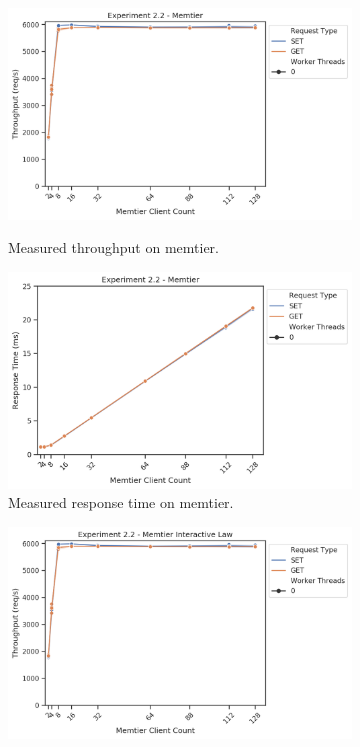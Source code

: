         \begin{figure}
            \vspace*{-.5\baselineskip}
                \centering
            \begin{subfigure}[t!]{0.45\textwidth}
                \centering
                \includegraphics[width=\textwidth]{../data_analysis/figures/2-2_mt_throughput.png}
                \caption{Measured throughput on memtier.\label{fig:22_mt_tp}}
                \includegraphics[width=\textwidth]{../data_analysis/figures/2-2_mt_response_time.png}
                \caption{Measured response time on memtier.\label{fig:22_mt_rt}}
            \end{subfigure}
            \begin{subfigure}[t!]{0.45\textwidth}
                \centering
                \includegraphics[width=\textwidth]{../data_analysis/figures/2-2_mt_throughput-il.png}

\end{subfigure}
\end{figure}

